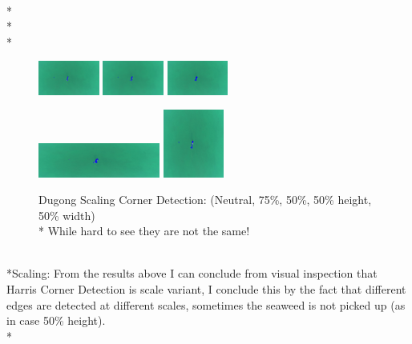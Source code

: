 \documentclass[conference]{IEEEtran}
\begin{document}
\\*\\*\\*
\begin{figure}[htbp]
    \centerline{
        {\includegraphics[width=20mm, scale=0.5]{./figures/Harris Corner/DugongNeutral Corners.png}}
        {\includegraphics[width=20mm, scale=0.5]{./figures/Harris Corner/Dugong75 Corners.png}}
        {\includegraphics[width=20mm, scale=0.5]{./figures/Harris Corner/Dugong50 Corners.png}}
    }
    \centerline{
        {\includegraphics[width=40mm, scale=0.5]{./figures/Harris Corner/DugongheightReduced Corners.png}}
        {\includegraphics[width=20mm, scale=0.5]{./figures/Harris Corner/DugongwidthReduced Corners.png}}
    }
    \caption{Dugong Scaling Corner Detection: (Neutral, 75\%, 50\%, 50\% height, 50\% width)\\*
    While hard to see they are not the same!}
    \label{fig}
\end{figure}
\\*Scaling:
From the results above I can conclude from visual inspection that Harris Corner Detection is scale variant, I conclude this by the fact that different edges are detected at different scales, sometimes the seaweed is not picked up (as in case 50\% height).
\\*
\end{document}
